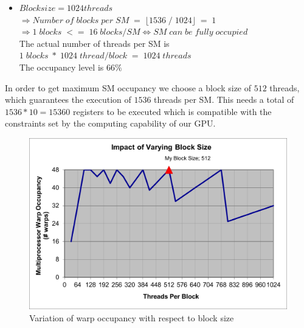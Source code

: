 \begin{itemize}
  \item $Block size = 1024 threads$ \\ $\Rightarrow Number \; of \; blocks \; per \; SM \; =   \; \lfloor 1536 \; / \; 1024 \rfloor \; = \; 1$ \\ $\Rightarrow 1\;blocks\; <= \; 16\;blocks/SM \Leftrightarrow SM \; can \; be \; fully \; occupied$ \\ The actual number of threads per SM is $1\;blocks\;*\;1024\;thread/block\;=\;1024\;threads$ \\The occupancy level is $66\%$
\end{itemize}
In order to get maximum SM occupancy we choose a block size of $512$ threads, which guarantees the execution of $1536$ threads per SM. This needs a total of $1536*10=15360$ registers to be executed which is compatible with the constraints set by the computing capability of our GPU.

\begin{figure}
  \begin{center}
    \includegraphics[scale=1]{img/Immagine1.png}
  \end{center}
  
  \caption{Variation of warp occupancy with respect to block size}
  \label{img:warp-occupacy}
\end{figure}